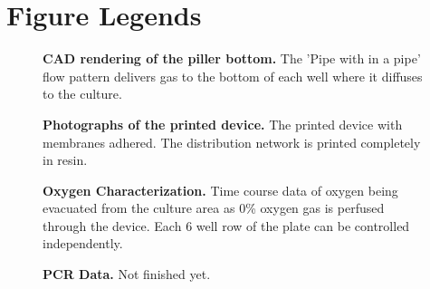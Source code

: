 \section*{Figure Legends}
%


\begin{figure}
\caption{
{\bf CAD rendering of the piller bottom.} The 'Pipe with in a pipe' flow pattern delivers gas to the bottom of each well where it diffuses to the culture.  
}
\label{piller-well-render-figure}
\end{figure}

\begin{figure}
\caption{
{\bf Photographs of the printed device.}  The printed device with membranes adhered. The distribution network is printed completely in resin.
}
\label{device-photos-figure}
\end{figure}

\begin{figure}
\caption{
{\bf Oxygen Characterization.}  Time course data of oxygen being evacuated from the culture area as 0\% oxygen gas is perfused through the device. Each 6 well row of the plate can be controlled independently.  
}
\label{oxygen-char-figure}
\end{figure}

\begin{figure}
\caption{
{\bf PCR Data.}  Not finished yet.  
}
\label{pcr-data}
\end{figure}



